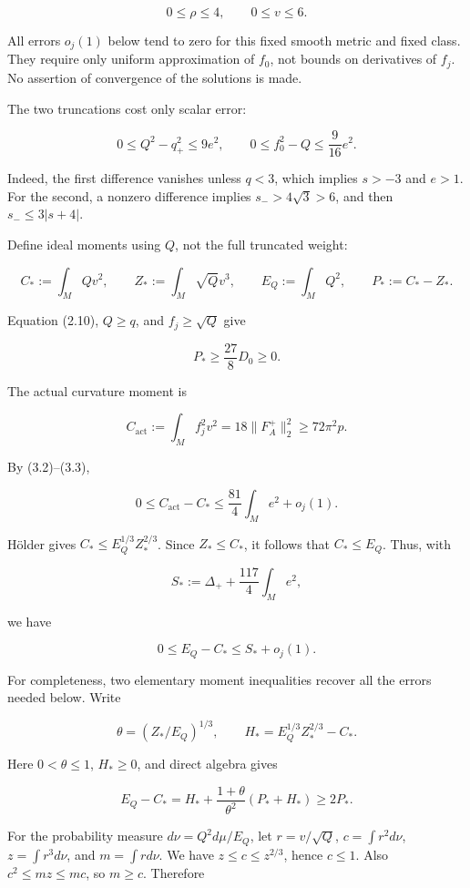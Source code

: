 \documentclass[
  11pt,
]{article}
\begin{document}
\[
                           0\le\rho\le4,\qquad 0\le v\le6.
 \tag{3.2}
\]

All errors \(o_j(1)\) below tend to zero for this fixed smooth metric
and fixed class. They require only uniform approximation of \(f_0\), not
bounds on derivatives of \(f_j\). No assertion of convergence of the
solutions is made.

The two truncations cost only scalar error:

\[
 0\le Q^2-q_+^2\le9e^2,\qquad
 0\le f_0^2-Q\le\frac9{16}e^2.                          \tag{3.3}
\]

Indeed, the first difference vanishes unless \(q<3\), which implies
\(s>-3\) and \(e>1\). For the second, a nonzero difference implies
\(s_->4\sqrt3>6\), and then \(s_-\le3|s+4|\).

Define ideal moments using \(Q\), not the full truncated weight:

\[
 C_*:=\int_M Qv^2,\qquad Z_*:=\int_M\sqrt Qv^3,
 \qquad E_Q:=\int_M Q^2,\qquad P_*:=C_*-Z_*.
 \tag{3.4}
\]

Equation (2.10), \(Q\ge q\), and \(f_j\ge\sqrt Q\) give

\[
 P_*\ge\frac{27}{8}D_0\ge0.                            \tag{3.5}
\]

The actual curvature moment is

\[
 C_{\mathrm{act}}:=\int_M f_j^2v^2
                      =18\|F_A^+\|_2^2\ge72\pi^2p.
\]

By (3.2)--(3.3),

\[
 0\le C_{\mathrm{act}}-C_*
                     \le\frac{81}{4}\int_M e^2+o_j(1).
\]

Hölder gives \(C_*\le E_Q^{1/3}Z_*^{2/3}\). Since \(Z_*\le C_*\), it
follows that \(C_*\le E_Q\). Thus, with

\[
                        S_*:=\Delta_++\frac{117}{4}\int_Me^2,
\]

we have

\[
                     0\le E_Q-C_*\le S_*+o_j(1).         \tag{3.6}
\]

For completeness, two elementary moment inequalities recover all the
errors needed below. Write

\[
 \theta=(Z_*/E_Q)^{1/3},\qquad
 H_*=E_Q^{1/3}Z_*^{2/3}-C_*.
\]

Here \(0<\theta\le1\), \(H_*\ge0\), and direct algebra gives

\[
 E_Q-C_*=H_*+\frac{1+\theta}{\theta^2}(P_*+H_*)\ge2P_*.
 \tag{3.7}
\]

For the probability measure \(d\nu=Q^2d\mu/E_Q\), let \(r=v/\sqrt Q\),
\(c=\int r^2d\nu\), \(z=\int r^3d\nu\), and \(m=\int rd\nu\). We have
\(z\le c\le z^{2/3}\), hence \(c\le1\). Also \(c^2\le mz\le mc\), so
\(m\ge c\). Therefore
\end{document}
